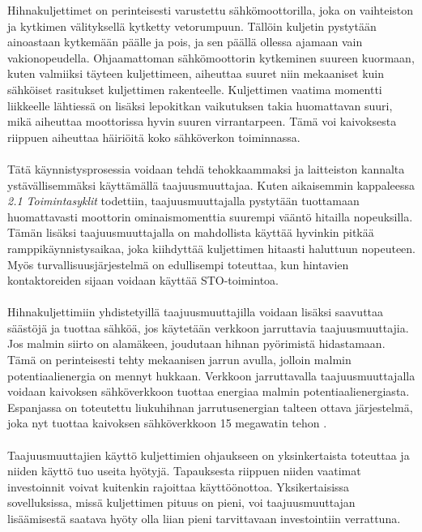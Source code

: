 \documentclass[finnish,12pt,a4paper,pdftex,elec,utf8]{aaltothesis}
\begin{document}
\noindent
Hihnakuljettimet on perinteisesti varustettu sähkömoottorilla, joka on vaihteiston ja kytkimen välityksellä kytketty vetorumpuun. Tällöin kuljetin pystytään ainoastaan kytkemään päälle ja pois, ja sen päällä ollessa ajamaan vain vakionopeudella. Ohjaamattoman sähkömoottorin kytkeminen suureen kuormaan, kuten valmiiksi täyteen kuljettimeen, aiheuttaa suuret niin mekaaniset kuin sähköiset rasitukset kuljettimen rakenteelle. Kuljettimen vaatima momentti liikkeelle lähtiessä on lisäksi lepokitkan vaikutuksen takia huomattavan suuri, mikä aiheuttaa moottorissa hyvin suuren virrantarpeen. Tämä voi kaivoksesta riippuen aiheuttaa häiriöitä koko sähköverkon toiminnassa. \cite{MyyntiHaastattelu}
\\\\
Tätä käynnistysprosessia voidaan tehdä tehokkaammaksi ja laitteiston kannalta ystävällisemmäksi käyttämällä taajuusmuuttajaa. Kuten aikaisemmin kappaleessa \textit{2.1 Toimintasyklit} todettiin, taajuusmuuttajalla pystytään tuottamaan huomattavasti moottorin ominaismomenttia suurempi vääntö hitailla nopeuksilla. Tämän lisäksi taajuusmuuttajalla on mahdollista käyttää hyvinkin pitkää ramppikäynnistysaikaa, joka kiihdyttää kuljettimen hitaasti haluttuun nopeuteen. Myös turvallisuusjärjestelmä on edullisempi toteuttaa, kun hintavien kontaktoreiden sijaan voidaan käyttää STO-toimintoa. 
\\\\
Hihnakuljettimiin yhdistetyillä taajuusmuuttajilla voidaan lisäksi saavuttaa säästöjä ja tuottaa sähköä, jos käytetään verkkoon jarruttavia taajuusmuuttajia. Jos malmin siirto on alamäkeen, joudutaan hihnan pyörimistä hidastamaan. Tämä on perinteisesti tehty mekaanisen jarrun avulla, jolloin malmin potentiaalienergia on mennyt hukkaan. Verkkoon jarruttavalla taajuusmuuttajalla voidaan kaivoksen sähköverkkoon tuottaa energiaa malmin potentiaalienergiasta. Espanjassa on toteutettu liukuhihnan jarrutusenergian talteen ottava järjestelmä, joka nyt tuottaa kaivoksen sähköverkkoon 15 megawatin tehon \cite{Rodriguez}.
\\\\
Taajuusmuuttajien käyttö kuljettimien ohjaukseen on yksinkertaista toteuttaa ja  niiden käyttö tuo useita hyötyjä. Tapauksesta riippuen niiden vaatimat investoinnit voivat kuitenkin rajoittaa käyttöönottoa. Yksikertaisissa sovelluksissa, missä kuljettimen pituus on pieni, voi taajuusmuuttajan lisäämisestä saatava hyöty olla liian pieni tarvittavaan investointiin verrattuna. 


\end{document}
